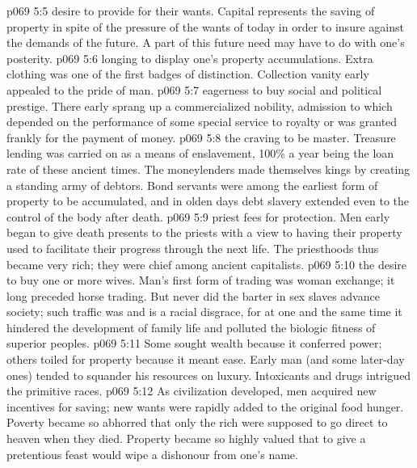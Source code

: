 \vs p069 5:5 \bibnobreakspace {} desire to provide for their wants. Capital represents the saving of property in spite of the pressure of the wants of today in order to insure against the demands of the future. A part of this future need may have to do with one’s posterity.
\vs p069 5:6 \bibnobreakspace {} longing to display one’s property accumulations. Extra clothing was one of the first badges of distinction. Collection vanity early appealed to the pride of man.
\vs p069 5:7 \bibnobreakspace {} eagerness to buy social and political prestige. There early sprang up a commercialized nobility, admission to which depended on the performance of some special service to royalty or was granted frankly for the payment of money.
\vs p069 5:8 \bibnobreakspace {} the craving to be master. Treasure lending was carried on as a means of enslavement, 100\% a year being the loan rate of these ancient times. The moneylenders made themselves kings by creating a standing army of debtors. Bond servants were among the earliest form of property to be accumulated, and in olden days debt slavery extended even to the control of the body after death.
\vs p069 5:9 \bibnobreakspace {} priest fees for protection. Men early began to give death presents to the priests with a view to having their property used to facilitate their progress through the next life. The priesthoods thus became very rich; they were chief among ancient capitalists.
\vs p069 5:10 \bibnobreakspace {} the desire to buy one or more wives. Man’s first form of trading was woman exchange; it long preceded horse trading. But never did the barter in sex slaves advance society; such traffic was and is a racial disgrace, for at one and the same time it hindered the development of family life and polluted the biologic fitness of superior peoples.
\vs p069 5:11 \bibnobreakspace {} Some sought wealth because it conferred power; others toiled for property because it meant ease. Early man (and some later\hyp{}day ones) tended to squander his resources on luxury. Intoxicants and drugs intrigued the primitive races.
\vs p069 5:12 \pc As civilization developed, men acquired new incentives for saving; new wants were rapidly added to the original food hunger. Poverty became so abhorred that only the rich were supposed to go direct to heaven when they died. Property became so highly valued that to give a pretentious feast would wipe a dishonour from one’s name.
